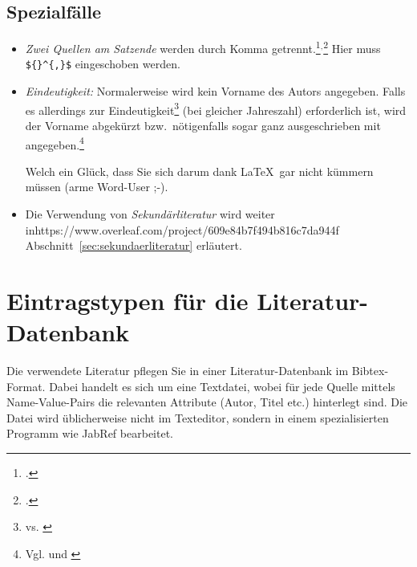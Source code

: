 \subsection{Spezialfälle}
\begin{itemize}
\item \emph{Zwei Quellen am Satzende} werden durch Komma getrennt.\footcite{Staab}${}^{,}$\footcite{mayerLukas:PA1} Hier muss \verb|${}^{,}$| eingeschoben werden.
\item \emph{Eindeutigkeit:} Normalerweise wird kein Vorname des Autors angegeben. Falls es allerdings zur Eindeutigkeit\footnote{\cite{trautwein2011unternehmensplanspiele} vs. \cite{hitzler2011optimierung}} (bei gleicher Jahreszahl) erforderlich ist, wird der Vorname abgekürzt bzw.\ nötigenfalls sogar ganz ausgeschrieben mit angegeben.\footnote{Vgl. \cite{mayer:PA1} und \cite{mayerLukas:PA1}}
 
Welch ein Glück, dass Sie sich darum dank \LaTeX\ gar nicht kümmern müssen (arme Word\texttrademark-User ;-).

\item Die Verwendung von \emph{Sekundärliteratur} wird weiter inhttps://www.overleaf.com/project/609e84b7f494b816c7da944f Abschnitt~\ref{sec:sekundaerliteratur} erläutert.
\end{itemize}


\section{Eintragstypen für die Literatur-Datenbank}

Die verwendete Literatur pflegen Sie in einer Literatur-Datenbank im Bibtex-Format. Dabei handelt es sich um eine Textdatei, wobei für jede Quelle mittels Name-Value-Pairs die relevanten Attribute (Autor, Titel etc.) hinterlegt sind. Die Datei wird üblicherweise nicht im Texteditor, sondern in einem spezialisierten Programm wie JabRef bearbeitet.

